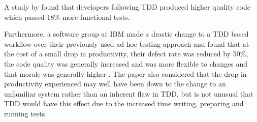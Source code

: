 A study by \cite{George:2003:IIT:952532.952753} found that developers following TDD produced higher quality code which passed 18\% more functional tests.

Furthermore, a software group at IBM made a drastic change to a TDD based workflow over their previously used ad-hoc testing approach and found that at the cost of a small drop in productivity, their defect rate was reduced by 50\%, the code quality was generally increased and was more flexible to changes and that morale was generally higher \citep{IBMTDD}. 
The paper also considered that the drop in productivity experienced may well have been down to the change to an unfamiliar system rather than an inherent flaw in TDD, but is not unusual that TDD would have this effect due to the increased time writing, preparing and running tests.
